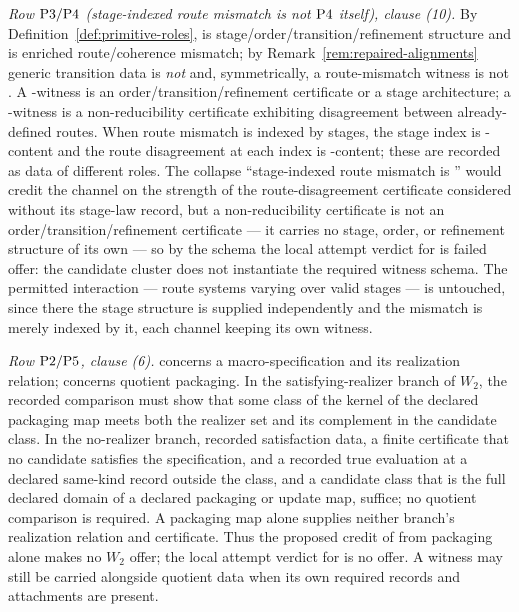 \emph{Row \(\mathrm{P3}{}/\mathrm{P4}{}\) (stage-indexed route mismatch is not
\(\mathrm{P4}{}\) itself), clause (10).} By Definition~\ref{def:primitive-roles},
\Pfour{} is stage/order/transition/refinement structure and \Pthree{} is
enriched route/coherence mismatch; by Remark~\ref{rem:repaired-alignments}
generic transition data is \emph{not} \Pthree{} and, symmetrically, a
route-mismatch witness is not \Pfour{}. A \Pfour{}-witness is an
order/transition/refinement certificate or a stage architecture; a
\Pthree{}-witness is a non-reducibility certificate exhibiting disagreement
between already-defined routes. When route mismatch is indexed by stages, the
stage index is \Pfour{}-content and the route disagreement at each index is
\Pthree{}-content; these are recorded as data of different roles. The collapse
``stage-indexed route mismatch is \Pfour{}'' would credit the \Pfour{} channel
on the strength of the route-disagreement certificate considered without its
stage-law record, but a
non-reducibility certificate is not an order/transition/refinement certificate
--- it carries no stage, order, or refinement structure of its own --- so by the
schema the local attempt verdict for \Pfour{} is failed offer: the candidate
cluster does not instantiate the required \Pfour{} witness schema. The permitted
interaction --- route systems varying over valid stages --- is untouched, since
there the \Pfour{} stage structure is supplied independently and the \Pthree{}
mismatch is merely indexed by it, each channel keeping its own witness.

\emph{Row \(\mathrm{P2}{}/\mathrm{P5}{}\), clause (6).} \Ptwo{} concerns a
macro-specification and its realization relation; \Pfive{} concerns
quotient packaging. In the satisfying-realizer branch of \(W_2\), the recorded
comparison must show that some class of the kernel of the declared packaging
map meets both the realizer set and its complement in the candidate class. In the no-realizer branch, recorded satisfaction data, a
finite certificate that no candidate satisfies the specification, and a
recorded true evaluation at a declared same-kind record outside the class,
and a candidate class that is the full declared domain of a declared
packaging or update map, suffice; no quotient comparison is required. A packaging map alone
supplies neither branch's realization relation and certificate. Thus the
proposed credit of \Ptwo{} from \Pfive{} packaging alone makes no \(W_2\)
offer; the local attempt verdict for \Ptwo{} is no offer. A
\Ptwo{} witness may still be carried alongside \Pfive{} quotient data when its
own required records and attachments are present.

